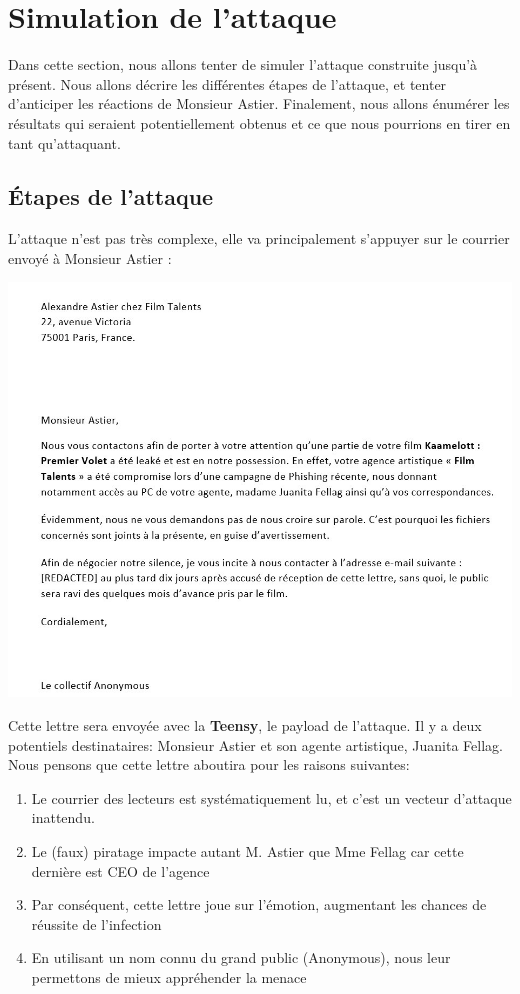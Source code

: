 \section{Simulation de l'attaque}

Dans cette section, nous allons tenter de simuler l'attaque construite jusqu'à présent. 
Nous allons décrire les différentes étapes de l'attaque, et tenter d'anticiper les réactions
de Monsieur Astier. Finalement, nous allons énumérer les résultats qui seraient potentiellement obtenus
et ce que nous pourrions en tirer en tant qu'attaquant.

\subsection{Étapes de l'attaque}

L'attaque n'est pas très complexe, elle va principalement s'appuyer sur le courrier envoyé à Monsieur Astier :

\includegraphics[scale=0.4]{images/courrier.jpeg}

Cette lettre sera envoyée avec la \textbf{Teensy}, le payload de l'attaque.
Il y a deux potentiels destinataires: Monsieur Astier et son agente artistique, Juanita Fellag. 
Nous pensons que cette lettre aboutira pour les raisons suivantes:
\begin{enumerate}
    \item Le courrier des lecteurs est systématiquement lu, et c'est un vecteur d'attaque inattendu.
    \item Le (faux) piratage impacte autant M. Astier que Mme Fellag car cette dernière est CEO de l'agence
    \item Par conséquent, cette lettre joue sur l'émotion, augmentant les chances de réussite de l'infection
    \item En utilisant un nom connu du grand public (Anonymous), nous leur permettons de mieux appréhender la menace 
\end{enumerate}

